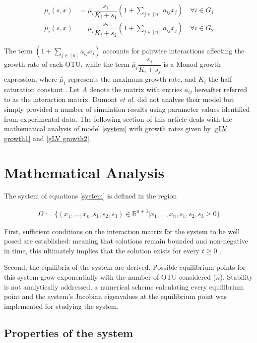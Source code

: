\documentclass[3p,times]{article}
\newcommand{\R}{\mathbb{R}}
\begin{document}
\begin{align}
\label{gLV growth1}\mu_i(s,x) &= \bar{\mu}_i \dfrac{s_1}{K_i + s_1}\left(1+\sum \limits_{j\in [n]} a_{ij} x_{j} \right) \quad \forall i \in G_1 \\
\label{gLV growth2}\mu_i(s,x) &= \bar{\mu}_i \dfrac{s_2}{K_i + s_2}\left(1+\sum \limits_{j\in [n]} a_{ij} x_{j} \right) \quad \forall i \in G_2 
\end{align}

The term $\left(1+\sum \limits_{j\in [n]} a_{ij} x_{j} \right)$ accounts for pairwise interactions affecting the growth rate of each OTU, while the term $\bar{\mu}_i\dfrac{s_j}{K_i + s_j}$ is a Monod growth expression, where $\bar{\mu}_i$ represents the maximum growth rate, and $K_i$ the half saturation constant \cite{monod1942recherches}. Let $A$ denote the matrix
with entries $a_{ij}$ hereafter referred to as the interaction matrix. Dumont\textit{ et al.} did not analyse their model but simply provided a number of simulation results using parameter values identified from experimental data. The following section of this article deals with the mathematical analysis of model \eqref{system} with growth rates given by \eqref{gLV growth1} and \eqref{gLV growth2}.

\section{Mathematical Analysis}

The system of equations \eqref{system} is defined in the region 

\begin{align*}
\Omega := \{ (x_1,\dots,x_n,s_1,s_2,s_3)\in  \R^{n+3} | x_1,\dots,x_n,s_1,s_2,s_3  \geq 0  \}
\end{align*}

First, sufficient conditions on the interaction matrix for the system to be well posed are established: meaning that solutions remain bounded and non-negative in time, this ultimately implies that the solution exists for every $t \geq 0$ \cite{Khalil1996}. 

Second, the equilibria of the system are derived. Possible equilibrium points for this system grow exponentially with the number of OTU considered ($n$).  Stability is not analytically addressed, a numerical scheme calculating every equilibrium point and the system's Jacobian eigenvalues at the equilibrium point was implemented for studying the system. 


\subsection{Properties of the system}
\end{document}
